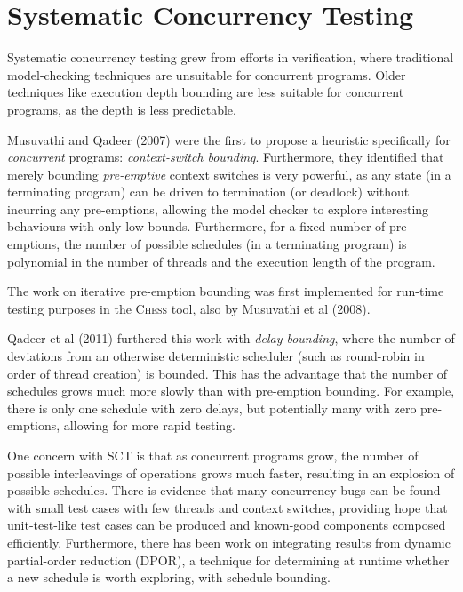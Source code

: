 \section{Systematic Concurrency Testing}
\label{sec:litrev-sct}

Systematic concurrency testing grew from efforts in
verification\cite{pbound}, where traditional model-checking techniques
are unsuitable for concurrent programs. Older techniques like
execution depth bounding are less suitable for concurrent programs, as
the depth is less predictable.

Musuvathi and Qadeer (2007) were the first to propose a heuristic
specifically for \textit{concurrent} programs: \textit{context-switch
  bounding}. Furthermore, they identified that merely bounding
\textit{pre-emptive} context switches is very powerful, as any state
(in a terminating program) can be driven to termination (or deadlock)
without incurring any pre-emptions, allowing the model checker to
explore interesting behaviours with only low bounds. Furthermore, for
a fixed number of pre-emptions, the number of possible schedules (in a
terminating program) is polynomial in the number of threads and the
execution length of the program.

The work on iterative pre-emption bounding was first implemented for
run-time testing purposes in the \textsc{Chess}\cite{heisenbugs} tool,
also by Musuvathi et al (2008).

Qadeer et al (2011) furthered this work with \textit{delay bounding},
where the number of deviations from an otherwise deterministic
scheduler (such as round-robin in order of thread creation) is
bounded. This has the advantage that the number of schedules grows
much more slowly than with pre-emption bounding. For example, there is
only one schedule with zero delays, but potentially many with zero
pre-emptions, allowing for more rapid testing.

One concern with SCT is that as concurrent programs grow, the number
of possible interleavings of operations grows much faster, resulting
in an explosion of possible schedules. There is evidence that many
concurrency bugs can be found with small test cases with few threads
and context switches\cite{pbound, dbound, empirical}, providing hope
that unit-test-like test cases can be produced and known-good
components composed efficiently. Furthermore, there has been work on
integrating results from dynamic partial-order reduction (DPOR), a
technique for determining at runtime whether a new schedule is worth
exploring, with schedule bounding\cite{bpor}.

